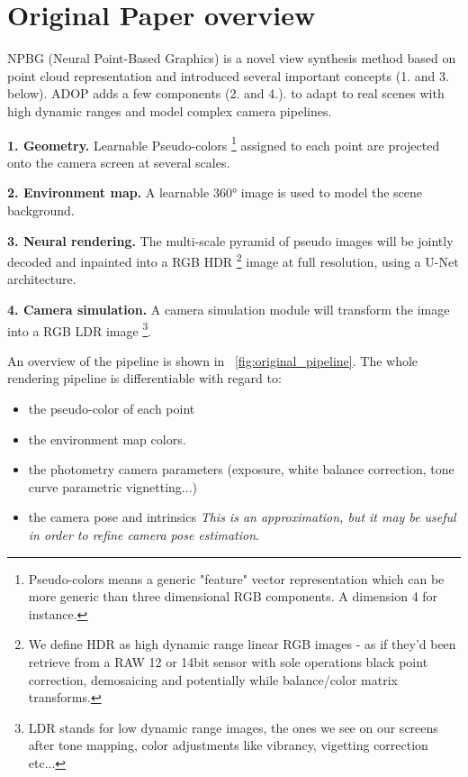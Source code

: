 \section{Original Paper overview}
\label{sec:methodology_paper}

NPBG \cite{Aliev2020} (Neural Point-Based Graphics) is a novel view synthesis method based on point cloud representation and introduced several important concepts (1. and 3. below).
ADOP \cite{Aruckert2022adop} adds a few components  (2. and 4.). to adapt to real scenes with high dynamic ranges and model complex camera pipelines.

\noindent\textbf{1. Geometry.} Learnable Pseudo-colors  \footnote{Pseudo-colors means a generic "feature" vector representation which can be more generic than three dimensional RGB components. A dimension 4 for instance.} assigned to each point are projected onto the camera screen at several scales. 

\noindent\textbf{2. Environment map.} A learnable 360° image is used to model the scene background.

\noindent\textbf{3. Neural rendering.} The multi-scale pyramid of pseudo images will be jointly decoded and inpainted into a RGB HDR \footnote{We define HDR as high dynamic range linear RGB images - as if they'd been retrieve from a RAW 12 or 14bit sensor with sole operations black point correction, demosaicing and potentially while balance/color matrix transforms.} image at full resolution, using a U-Net architecture.

\noindent\textbf{4. Camera simulation.} A camera simulation module will transform the image into a RGB LDR image \footnote{LDR stands for low dynamic range images, the ones we see on our screens after tone mapping, color adjustments like vibrancy, vigetting correction etc...}. 

\noindent An overview of the pipeline is shown in ~\cref{fig:original_pipeline}.
\noindent The whole rendering pipeline is differentiable with regard to:
\begin{itemize}
    \item the pseudo-color of each point
    \item the environment map colors.
    \item the photometry camera parameters (exposure, white balance correction, tone curve parametric vignetting...)
    \item the camera pose and intrinsics \textit{This is an approximation, but it may be useful in order to refine camera pose estimation}. 
\end{itemize}

